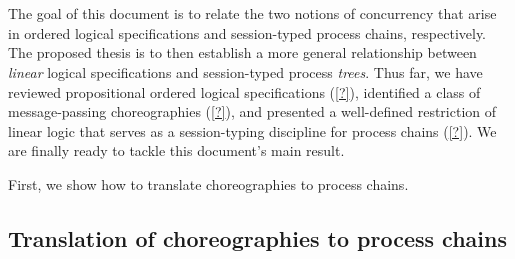 % 











% 

\section{}

The goal of this document is to relate the two notions of concurrency that arise in ordered logical specifications and session-typed process chains, respectively.
The proposed thesis is to then establish a more general relationship between \emph{linear} logical specifications and session-typed process \emph{trees}.
Thus far, we have reviewed propositional ordered logical specifications (\cref{?}), identified a class of message-passing choreographies (\cref{?}), and presented a well-defined restriction of linear logic that serves as a session-typing discipline for process chains (\cref{?}).
We are finally ready to tackle this document's main result.

First, we show how to translate choreographies to process chains.

\subsection{Translation of choreographies to process chains}

